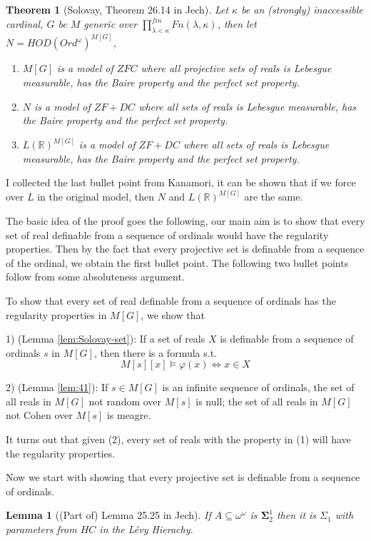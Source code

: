 \documentclass{article}
\newtheorem{lemma}{Lemma}
\newtheorem{theorem}{Theorem}
\begin{document}
\begin{theorem}[Solovay, Theorem 26.14 in Jech]
    Let $\kappa$ be an (strongly) inaccessible cardinal, $G$ be $M$ generic over $\prod^{fin}_{\lambda<\kappa}Fn(\lambda,\kappa)$, then let $N = HOD(Ord^{\omega})^{M[G]}$,\begin{enumerate}
        \item $M[G]$ is a model of $ZFC$ where all projective sets of reals is Lebesgue measurable, has the Baire property and the perfect set property.
        \item $N$ is a model of $ZF+DC$ where all sets of reals is Lebesgue measurable, has the Baire property and the perfect set property.
        \item $L(\mathbb{R})^{M[G]}$ is a model of $ZF+DC$ where all sets of reals is Lebesgue measurable, has the Baire property and the perfect set property.
    \end{enumerate}
\end{theorem}

I collected the last bullet point from Kanamori, it can be shown that if we force over $L$ in the original model, then $N$ and $L(\mathbb{R})^{M[G]}$ are the same.

The basic idea of the proof goes the following, our main aim is to show that every set of real definable from a sequence of ordinals would have the regularity properties. Then by the fact that every projective set is definable from a sequence of the ordinal, we obtain the first bullet point. The following two bullet points follow from some absoluteness argument. 

To show that every set of real definable from a sequence of ordinals has the regularity properties in $M[G]$, we show that 

1) (Lemma \ref{lem:Solovay-set}): If a set of reals $X$ is definable from a sequence of ordinals $s$ in $M[G]$, then there is a formula s.t. $$M[s][x]\models \varphi(x) \iff x\in X$$

2) (Lemma \ref{lem:41}): If $s\in M[G]$ is an infinite sequence of ordinals, the set of all reals in $M[G]$ not random over $M[s]$ is null; the set of all reals in $M[G]$ not Cohen over $M[s]$ is meagre.

It turns out that given (2), every set of reals with the property in (1) will have the regularity properties. 

Now we start with showing that every projective set is definable from a sequence of ordinals. 

\begin{lemma}[(Part of) Lemma 25.25 in Jech]
    If $A\subseteq \omega^\omega$ is $\boldsymbol{\Sigma}^1_2$ then it is $\Sigma_1$ with parameters from $HC$ in the L\'evy Hierachy.
\end{lemma}
\end{document}
